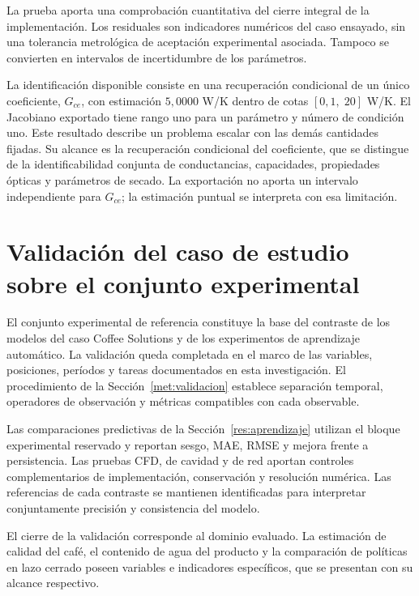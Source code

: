 La prueba aporta una comprobación cuantitativa del cierre integral de la implementación. Los residuales son indicadores numéricos del caso ensayado, sin una tolerancia metrológica de aceptación experimental asociada. Tampoco se convierten en intervalos de incertidumbre de los parámetros.

La identificación disponible consiste en una recuperación condicional de un único coeficiente, $G_{ce}$, con estimación $5{,}0000$ W/K dentro de cotas $[0{,}1,\;20]$ W/K. El Jacobiano exportado tiene rango uno para un parámetro y número de condición uno. Este resultado describe un problema escalar con las demás cantidades fijadas. Su alcance es la recuperación condicional del coeficiente, que se distingue de la identificabilidad conjunta de conductancias, capacidades, propiedades ópticas y parámetros de secado. La exportación no aporta un intervalo independiente para $G_{ce}$; la estimación puntual se interpreta con esa limitación.

\FloatBarrier

\section{Validación del caso de estudio sobre el conjunto experimental}
\label{res:validacion_fisica}

El conjunto experimental de referencia constituye la base del contraste de los modelos del caso Coffee Solutions y de los experimentos de aprendizaje automático. La validación queda completada en el marco de las variables, posiciones, períodos y tareas documentados en esta investigación. El procedimiento de la Sección~\ref{met:validacion} establece separación temporal, operadores de observación y métricas compatibles con cada observable.

Las comparaciones predictivas de la Sección~\ref{res:aprendizaje} utilizan el bloque experimental reservado y reportan sesgo, MAE, RMSE y mejora frente a persistencia. Las pruebas CFD, de cavidad y de red aportan controles complementarios de implementación, conservación y resolución numérica. Las referencias de cada contraste se mantienen identificadas para interpretar conjuntamente precisión y consistencia del modelo.

El cierre de la validación corresponde al dominio evaluado. La estimación de calidad del café, el contenido de agua del producto y la comparación de políticas en lazo cerrado poseen variables e indicadores específicos, que se presentan con su alcance respectivo.

